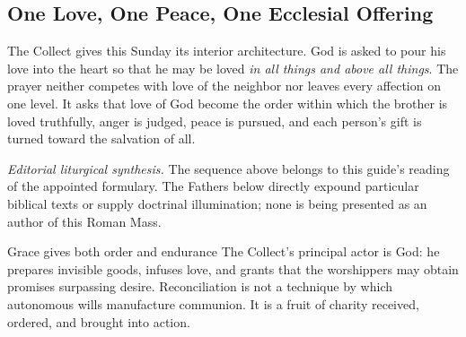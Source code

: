 \begin{deepstudy}

\section*{One Love, One Peace, One Ecclesial Offering}

The Collect gives this Sunday its interior architecture. God is asked to pour his love into the heart so that he may be loved \emph{in all things and above all things}. The prayer neither competes with love of the neighbor nor leaves every affection on one level. It asks that love of God become the order within which the brother is loved truthfully, anger is judged, peace is pursued, and each person's gift is turned toward the salvation of all.

\begin{center}
\end{center}

\noindent\emph{Editorial liturgical synthesis.} The sequence above belongs to this guide's reading of the appointed formulary. The Fathers below directly expound particular biblical texts or supply doctrinal illumination; none is being presented as an author of this Roman Mass.

\begin{massbox}{Grace gives both order and endurance}
The Collect's principal actor is God: he prepares invisible goods, infuses love, and grants that the worshippers may obtain promises surpassing desire. Reconciliation is not a technique by which autonomous wills manufacture communion. It is a fruit of charity received, ordered, and brought into action.
\end{massbox}

\sectionguard

\end{deepstudy}
